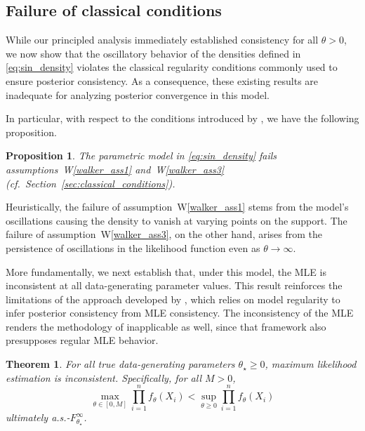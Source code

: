 \documentclass[11pt,twoside]{article}
\newtheorem{theorem}{Theorem}
\newtheorem{proposition}{Proposition}
\newcommand{\Wref}[1]{W\ref{#1}}
\begin{document}
\subsection{Failure of classical conditions}\label{sub:failure_conditions}

While our principled analysis immediately established consistency for all \(\theta > 0\), we now show that the oscillatory behavior of the densities defined in \eqref{eq:sin_density} violates the classical regularity conditions commonly used to ensure posterior consistency. As a consequence, these existing results are inadequate for analyzing posterior convergence in this model.

In particular, with respect to the conditions introduced by \cite{walker1969}, we have the following proposition.


\begin{proposition}\label{pro:failure_walker}
    The parametric model in \eqref{eq:sin_density} fails assumptions~\Wref{walker_ass1} and~\Wref{walker_ass3} (cf.\ Section~\ref{sec:classical_conditions}).
\end{proposition}

Heuristically, the failure of assumption~\Wref{walker_ass1} stems from the model’s oscillations causing the density to vanish at varying points on the support. The failure of assumption~\Wref{walker_ass3}, on the other hand, arises from the persistence of oscillations in the likelihood function even as \(\theta \to \infty\).

More fundamentally, we next establish that, under this model, the MLE is inconsistent at all data-generating parameter values. This result reinforces the limitations of the approach developed by \cite{walker1969}, which relies on model regularity to infer posterior consistency from MLE consistency. The inconsistency of the MLE renders the methodology of \cite{walker2001} inapplicable as well, since that framework also presupposes regular MLE behavior.

\begin{theorem}\label{thm:MLE_inconsistency}
    For all true data-generating parameters \(\theta_\star \geq 0\), maximum likelihood estimation is inconsistent. Specifically, for all \(M > 0\),
    \begin{equation*}
        \max_{\theta \in [0, M]} \prod_{i=1}^n f_\theta(X_i) < \sup_{\theta \geq 0} \prod_{i=1}^n f_\theta(X_i)
    \end{equation*}
    ultimately a.s.-\(F_{\theta_\star}^\infty\).
\end{theorem}
\end{document}
